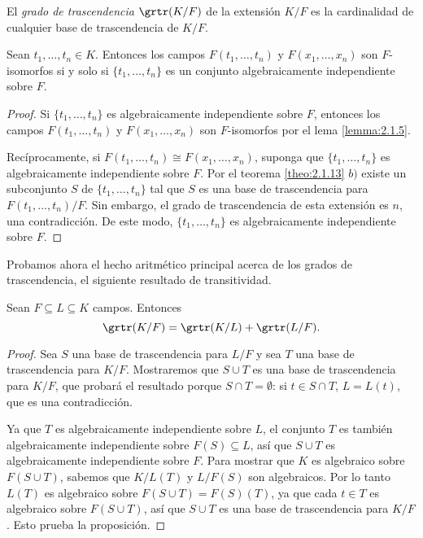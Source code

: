 \begin{definition}
  El \emph{grado de trascendencia} $\grtr(K/F)$ de la extensión $K/F$ es la cardinalidad de cualquier base de trascendencia de $K/F$.
\end{definition}

\begin{corollary}
  Sean $t_1, \ldots, t_n \in K$. Entonces los campos $F(t_1, \ldots, t_n)$ y $F(x_1, \ldots, x_n)$ son $F$-isomorfos si y solo si $\{t_1,\ldots, t_n\}$ es un conjunto algebraicamente independiente sobre $F$.
\end{corollary}
\begin{proof}
  Si $\{t_1, \ldots, t_n\}$ es algebraicamente independiente sobre $F$, entonces los campos $F(t_1, \ldots, t_n)$ y $F(x_1, \ldots, x_n)$ son $F$-isomorfos por el lema \ref{lemma:2.1.5}.

  Recíprocamente, si $F(t_1, \ldots, t_n) \cong F(x_1, \ldots, x_n)$, suponga que $\{t_1, \ldots, t_n\}$ es algebraicamente independiente sobre $F$. Por el teorema \ref{theo:2.1.13} $b)$ existe un subconjunto $S$ de $\{t_1, \ldots, t_n\}$ tal que $S$ es una base de trascendencia para $F(t_1, \ldots, t_n)/F$. Sin embargo, el grado de trascendencia de esta extensión es $n$, una contradicción. De este modo, $\{t_1, \ldots, t_n\}$ es algebraicamente independiente sobre $F$.
\end{proof}

Probamos ahora el hecho aritmético principal acerca de los grados de trascendencia, el siguiente resultado de transitividad.

\begin{proposition}
  Sean $F \subseteq L \subseteq K$ campos. Entonces
  \[
    \grtr(K/F) = \grtr(K/L) + \grtr(L/F).
  \]
\end{proposition}
\begin{proof}
  Sea $S$ una base de trascendencia para $L/F$ y sea $T$ una base de trascendencia para $K/F$. Mostraremos que $S \cup T$ es una base de trascendencia para $K/F$, que probará el resultado porque $S \cap T = \emptyset$: si $t \in S \cap T$, $L = L(t)$, que es  una contradicción.

  Ya que $T$ es algebraicamente independiente sobre $L$, el conjunto $T$ es también algebraicamente independiente sobre $F(S) \subseteq L$, así que $S \cup T$ es algebraicamente independiente sobre $F$. Para mostrar que $K$ es algebraico sobre $F(S \cup T)$, sabemos que $K/L(T)$ y $L/F(S)$ son algebraicos. Por lo tanto $L(T)$ es algebraico sobre $F(S \cup T)= F(S)(T)$, ya que cada $t \in T$ es algebraico sobre $F(S \cup T)$, así que $S \cup T$ es una base de trascendencia para $K/F$. Esto prueba la proposición.
\end{proof}

